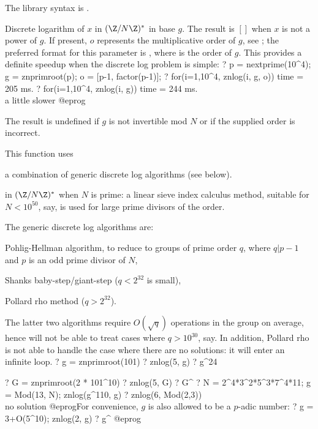 The library syntax is .

\label{se:znlog}
Discrete logarithm of $x$ in $(\Z/N\Z)^*$ in base $g$.
The result is $[]$ when $x$ is not a power of $g$.
If present, $o$ represents the multiplicative order of $g$, see
; the preferred format for this parameter is
, where  is the order of $g$.
This provides a definite speedup when the discrete log problem is simple:
\bprog
? p = nextprime(10^4); g = znprimroot(p); o = [p-1, factor(p-1)];
? for(i=1,10^4, znlog(i, g, o))
time = 205 ms.
? for(i=1,10^4, znlog(i, g))
time = 244 ms. \\ a little slower
@eprog

The result is undefined if $g$ is not invertible mod $N$ or if the supplied
order is incorrect.

This function uses

\item a combination of generic discrete log algorithms (see below).

\item in $(\Z/N\Z)^*$ when $N$ is prime: a linear sieve index calculus
method, suitable for $N < 10^{50}$, say, is used for large prime divisors of
the order.

The generic discrete log algorithms are:

\item Pohlig-Hellman algorithm, to reduce to groups of prime order $q$,
where $q | p-1$ and $p$ is an odd prime divisor of $N$,

\item Shanks baby-step/giant-step ($q < 2^{32}$ is small),

\item Pollard rho method ($q > 2^{32}$).

The latter two algorithms require $O(\sqrt{q})$ operations in the group on
average, hence will not be able to treat cases where $q > 10^{30}$, say.
In addition, Pollard rho is not able to handle the case where there are no
solutions: it will enter an infinite loop.
\bprog
? g = znprimroot(101)
? znlog(5, g)
? g^24

? G = znprimroot(2 * 101^10)
? znlog(5, G)
? G^%
? N = 2^4*3^2*5^3*7^4*11; g = Mod(13, N); znlog(g^110, g)
? znlog(6, Mod(2,3))  \\ no solution
@eprog\noindent For convenience, $g$ is also allowed to be a $p$-adic number:
\bprog
? g = 3+O(5^10); znlog(2, g)
? g^%
@eprog


